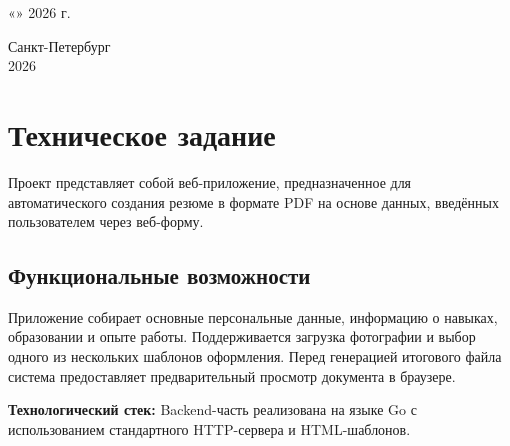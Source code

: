 \documentclass[a4paper, 14pt]{extarticle} %
\begin{document}
\begin{titlepage}
        \vspace{1cm}
        
        \begin{flushright}
            \large
            «\underline{\hspace{1cm}}» \underline{\hspace{3cm}} 2026 г.
        \end{flushright}
        
        \vspace{0.5cm}
        
        \vfill
        
        \begin{center}
            Санкт-Петербург \\
            2026
        \end{center}   
            
    \end{titlepage}
    
    \setcounter{page}{2}  
    
    \newpage
    \tableofcontents

    \newpage
    \section{Техническое задание}

Проект представляет собой веб-приложение, предназначенное для автоматического создания резюме в формате PDF на основе данных, введённых пользователем через веб-форму.

\subsection*{Функциональные возможности}
Приложение собирает основные персональные данные, информацию о навыках, образовании и опыте работы. Поддерживается загрузка фотографии и выбор одного из нескольких шаблонов оформления. Перед генерацией итогового файла система предоставляет предварительный просмотр документа в браузере. 

\textbf{Технологический стек:} Backend-часть реализована на языке Go с использованием стандартного HTTP-сервера и HTML-шаблонов.
\end{document}
